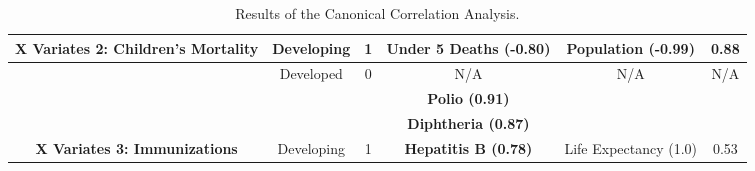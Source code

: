 \begin{table}[h!]
{\begin{tabular}{|cc|cccc|}
\multicolumn{1}{|c|}{\multirow{-6}{*}{\cellcolor[HTML]{EFEFEF}\textbf{X Variates 2: Children’s Mortality}}} & \multirow{-3}{*}{Developing} & \multicolumn{1}{c|}{\multirow{-3}{*}{1}}                    & \multicolumn{1}{c|}{\textbf{Under 5 Deaths (-0.80)}}                        & \multicolumn{1}{c|}{\multirow{-3}{*}{Population (-0.99)}}                   & \multirow{-3}{*}{0.88}         \\ \hline
\multicolumn{1}{|c|}{\cellcolor[HTML]{EFEFEF}}                                                              & Developed                    & \multicolumn{1}{c|}{0}                                      & \multicolumn{1}{c|}{N/A}                                                    & \multicolumn{1}{c|}{N/A}                                                    & N/A                            \\ \cline{2-6} 
\multicolumn{1}{|c|}{\cellcolor[HTML]{EFEFEF}}                                                              &                              & \multicolumn{1}{c|}{}                                       & \multicolumn{1}{c|}{\textbf{Polio (0.91)}}                                  & \multicolumn{1}{c|}{}                                                       &                                \\ \cline{4-4}
\multicolumn{1}{|c|}{\cellcolor[HTML]{EFEFEF}}                                                              &                              & \multicolumn{1}{c|}{}                                       & \multicolumn{1}{c|}{\textbf{Diphtheria (0.87)}}                             & \multicolumn{1}{c|}{}                                                       &                                \\ \cline{4-4}
\multicolumn{1}{|c|}{\multirow{-4}{*}{\cellcolor[HTML]{EFEFEF}\textbf{X Variates 3: Immunizations}}}        & \multirow{-3}{*}{Developing} & \multicolumn{1}{c|}{\multirow{-3}{*}{1}}                    & \multicolumn{1}{c|}{\textbf{Hepatitis B (0.78)}}                            & \multicolumn{1}{c|}{\multirow{-3}{*}{Life Expectancy (1.0)}}                & \multirow{-3}{*}{0.53}         \\ \hline
\end{tabular}%
}
\caption{Results of the Canonical Correlation Analysis.}
\label{tab:table_4}
\end{table}